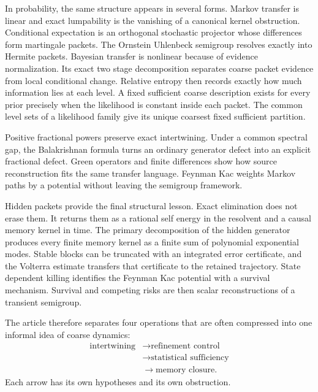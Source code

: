 \documentclass[11pt,a4paper]{article}
\theoremstyle{definition}
\theoremstyle{remark}
\begin{document}
In probability, the same structure appears in several forms. Markov transfer is linear and exact lumpability is the vanishing of a canonical kernel obstruction. Conditional expectation is an orthogonal stochastic projector whose differences form martingale packets. The Ornstein Uhlenbeck semigroup resolves exactly into Hermite packets. Bayesian transfer is nonlinear because of evidence normalization. Its exact two stage decomposition separates coarse packet evidence from local conditional change. Relative entropy then records exactly how much information lies at each level. A fixed sufficient coarse description exists for every prior precisely when the likelihood is constant inside each packet. The common level sets of a likelihood family give its unique coarsest fixed sufficient partition.

Positive fractional powers preserve exact intertwining. Under a common spectral gap, the Balakrishnan formula turns an ordinary generator defect into an explicit fractional defect. Green operators and finite differences show how source reconstruction fits the same transfer language. Feynman Kac weights Markov paths by a potential without leaving the semigroup framework.

Hidden packets provide the final structural lesson. Exact elimination does not erase them. It returns them as a rational self energy in the resolvent and a causal memory kernel in time. The primary decomposition of the hidden generator produces every finite memory kernel as a finite sum of polynomial exponential modes. Stable blocks can be truncated with an integrated error certificate, and the Volterra estimate transfers that certificate to the retained trajectory. State dependent killing identifies the Feynman Kac potential with a survival mechanism. Survival and competing risks are then scalar reconstructions of a transient semigroup.

The article therefore separates four operations that are often compressed into one informal idea of coarse dynamics:
\[
\begin{aligned}
\text{intertwining}
&\longrightarrow
\text{refinement control}\\
&\longrightarrow
\text{statistical sufficiency}\\
&\longrightarrow
\text{memory closure}.
\end{aligned}
\]
Each arrow has its own hypotheses and its own obstruction.





\clearpage
\end{document}
